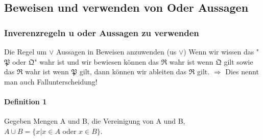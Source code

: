     \subsection{Beweisen und verwenden von Oder Aussagen}
        \subsubsection{Inverenzregeln u oder Aussagen zu verwenden}
            {
                Die Regel um \(\vee\) Aussagen in Beweisen anzuwenden (us \(\vee\))
            }
            {
                Wenn wir wissen das "\(\mathfrak{P}\) oder \(\mathfrak{Q}\)" wahr ist und wir bewiesen können das \(\mathfrak{R}\) wahr ist wenn \(\mathfrak{Q}\) gilt sowie das \(\mathfrak{R}\) wahr ist wenn \(\mathfrak{P}\) gilt, dann können wir ableiten das \(\mathfrak{R}\) gilt.
            }
            \(\Rightarrow\) Dies nennt man auch Fallunterscheidung!
            \paragraph{Definition 1}
                Gegeben Mengen A und B, die Vereinigung von A und B,\\ \(A \cup B = \{x \vert x \in A\) oder \(x \in B\}\). 
            \newpage
